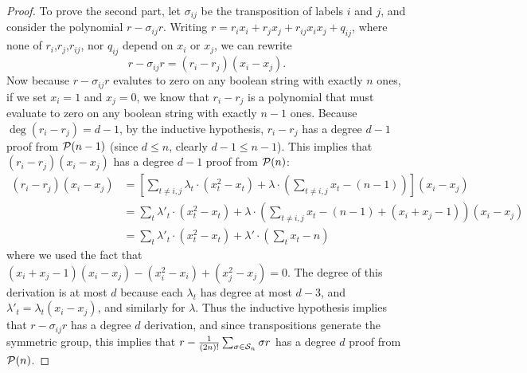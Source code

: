 \begin{proof}
To prove the second part, let $\sigma_{ij}$ be the transposition of labels $i$ and $j$, and consider the polynomial $r - \sigma_{ij}r$. Writing $r = r_ix_i + r_jx_j + r_{ij}x_ix_j + q_{ij}$, where none of $r_i$,$r_j$,$r_{ij}$, nor $q_{ij}$ depend on $x_i$ or $x_j$, we can rewrite
\[r - \sigma_{ij}r = (r_i - r_j)(x_i - x_j).\]
Now because $r - \sigma_{ij}r$ evalutes to zero on any boolean string with exactly $n$ ones, if we set $x_i = 1$ and $x_j = 0$, we know that $r_i - r_j$ is a polynomial that must evaluate to zero on any boolean string with exactly $n-1$ ones. Because $\deg (r_i - r_j) = d-1$, by the inductive hypothesis, $r_i - r_j$ has a degree $d-1$ proof from $\mathcal P(n-1)$ (since $d \leq n$, clearly $d-1 \leq n-1$). This implies that $(r_i - r_j)(x_i - x_j)$ has a degree $d-1$ proof from $\mathcal P(n)$:
\begin{align*}
(r_i - r_j)(x_i - x_j) &= \left[\sum_{t \neq i,j} \lambda_t\cdot (x_t^2 - x_t) + \lambda \cdot \left(\sum_{t \neq i,j} x_t - (n-1)\right)\right](x_i - x_j) \\
&= \sum_{t} \lambda'_t \cdot (x_t^2 - x_t) + \lambda \cdot \left(\sum_{t \neq i,j} x_t - (n-1) + (x_i + x_j - 1)\right)(x_i - x_j)\\
&= \sum_t \lambda'_t \cdot (x_t^2 - x_t) +\lambda' \cdot \left(\sum_t x_t - n\right)
\end{align*}
where we used the fact that $(x_i + x_j - 1)(x_i - x_j) - (x_i^2 - x_i) + (x_j^2 - x_j) = 0$. The degree of this derivation is at most $d$ because each $\lambda_t$ has degree at most $d-3$, and $\lambda'_t = \lambda_t(x_i - x_j)$, and similarly for $\lambda$. Thus the inductive hypothesis implies that $r - \sigma_{ij}r$ has a degree $d$ derivation, and since transpositions generate the symmetric group, this implies that $r - \frac{1}{(2n)!}\sum_{\sigma \in \mathcal S_n} \sigma r$ has a degree $d$ proof from $\mathcal P(n)$.
\end{proof}

